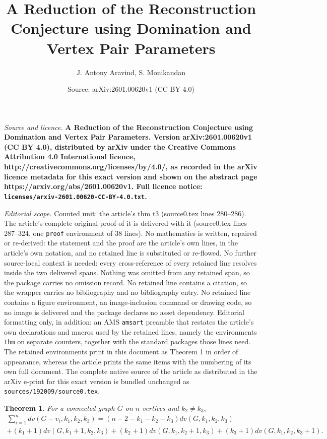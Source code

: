 \documentclass[10pt,a4paper]{amsart}
\title{\bf A Reduction of the Reconstruction Conjecture using Domination and Vertex Pair Parameters}
\author{J. Antony Aravind, S. Monikandan}
\date{Source: arXiv:2601.00620v1 (CC BY 4.0)}
\newtheorem{thm}{Theorem}
\begin{document}
\maketitle

\noindent\emph{Source and licence.} \bf A Reduction of the Reconstruction Conjecture using Domination and Vertex Pair Parameters. Version arXiv:2601.00620v1 (CC BY 4.0), distributed by arXiv under the Creative Commons Attribution 4.0 International licence, http://creativecommons.org/licenses/by/4.0/, as recorded in the arXiv licence metadata for this exact version and shown on the abstract page https://arxiv.org/abs/2601.00620v1. Full licence notice: \texttt{licenses/arxiv-2601.00620-CC-BY-4.0.txt}.\par\smallskip

\noindent\textit{Editorial scope.} Counted unit: the article's thm t3 (source0.tex lines 280--286). The article's complete original proof of it is delivered with it (source0.tex lines 287--324, one \texttt{proof} environment of 38 lines). No mathematics is written, repaired or re-derived: the statement and the proof are the article's own lines, in the article's own notation, and no retained line is substituted or re-flowed.  No further source-local context is needed: every cross-reference of every retained line resolves inside the two delivered spans.  Nothing was omitted from any retained span, so the package carries no omission record.  No retained line contains a citation, so the wrapper carries no bibliography and no bibliography entry.  No retained line contains a figure environment, an image-inclusion command or drawing code, so no image is delivered and the package declares no asset dependency.  Editorial formatting only, in addition: an AMS \texttt{amsart} preamble that restates the article's own declarations and macros used by the retained lines, namely the environments \texttt{thm} on separate counters, together with the standard packages those lines need.  The retained environments print in this document as Theorem 1 in order of appearance, whereas the article prints the same items with the numbering of its own full document.  The complete native source of the article as distributed in the arXiv e-print for this exact version is bundled unchanged as \texttt{sources/192009/source0.tex}.
\begin{thm}\label{t3}
For a connected graph $G$ on $n$ vertices and $k_2 \neq k_3,$ 
\begin{multline} 
\sum_{i=1}^{n}{dv(G-v_i,k_1,k_2,k_3)}=(n-2-k_1-k_2-k_3)dv(G,k_1,k_2,k_3)\\+(k_1+1)dv(G,k_1+1,k_2,k_3)
+(k_2+1)dv(G,k_1,k_2+1,k_3)+(k_3+1)dv(G,k_1,k_2,k_3+1). 
\end{multline}
\end{thm}
\end{document}
